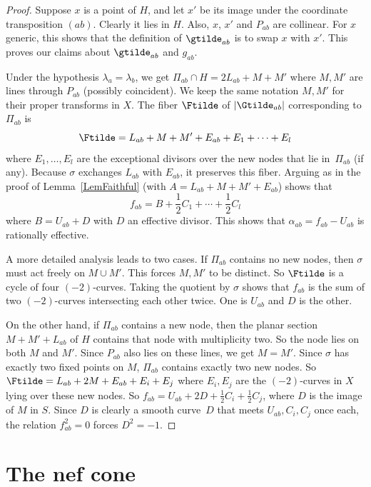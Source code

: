\begin{proof}
Suppose $x$ is a point of $H$, and let $x'$ be its image under the coordinate transposition $(ab)$. Clearly it lies in $H$. Also, $x$, $x'$ and $P_{ab}$ are collinear. For $x$ generic, this shows that the definition of $\gtilde_{ab}$ is to swap $x$ with $x'$. This proves our claims about $\gtilde_{ab}$ and $g_{ab}$.

Under the hypothesis $\lambda_a=\lambda_b$, we get $\Pi_{ab}\cap H=2L_{ab}+M+M'$ where $M,M'$ are lines through $P_{ab}$ (possibly coincident). We keep the same notation $M,M'$ for their proper transforms in $X$. The fiber $\Ftilde$ of $|\Gtilde_{ab}|$ corresponding to $\Pi_{ab}$ is
\begin{equation*}
\Ftilde=L_{ab}+M+M'+E_{ab}+E_1+\cdots+E_l
\end{equation*}
where $E_1,\dots,E_l$ are the exceptional divisors over the new nodes that lie in~$\Pi_{ab}$ (if any). Because $\sigma$ exchanges $L_{ab}$ with $E_{ab}$, it preserves this fiber. Arguing as in the proof of Lemma~\ref{LemFaithful} (with $A=L_{ab}+M+M'+E_{ab}$) shows that
\[
\textstyle f_{ab}=B+\frac12C_1+\cdots+\frac12C_l
\]
where $B=U_{ab}+D$ with $D$ an effective divisor. This shows that $\alpha_{ab}=f_{ab}-U_{ab}$ is rationally effective.

A more detailed analysis leads to two cases. If $\Pi_{ab}$ contains no new nodes, then $\sigma$ must act freely on $M\cup M'$. This forces $M,M'$ to be distinct. So $\Ftilde$ is a cycle of four $(-2)$-curves. Taking the quotient by $\sigma$ shows that $f_{ab}$ is the sum of two $(-2)$-curves intersecting each other twice. One is $U_{ab}$ and $D$ is the other.

On the other hand, if $\Pi_{ab}$ contains a new node, then the planar section $M+M'+L_{ab}$ of $H$ contains that node with multiplicity two. So the node lies on both $M$ and $M'$. Since $P_{ab}$ also lies on these lines, we get $M=M'$. Since $\sigma$ has exactly two fixed points on $M$, $\Pi_{ab}$ contains exactly two new nodes. So $\Ftilde=L_{ab}+2M+E_{ab}+E_i+E_j$ where $E_i,E_j$ are the $(-2)$-curves in $X$ lying over these new nodes. So $f_{ab}=U_{ab}+2D+\frac12 C_i+\frac12 C_j$, where $D$ is the image of $M$ in $S$. Since $D$ is clearly a smooth curve~$D$ that meets $U_{ab},C_i,C_j$ once each, the relation $f_{ab}^2=0$ forces $D^2=-1$.
\end{proof}

\section{The nef cone}\label{SecNef}

